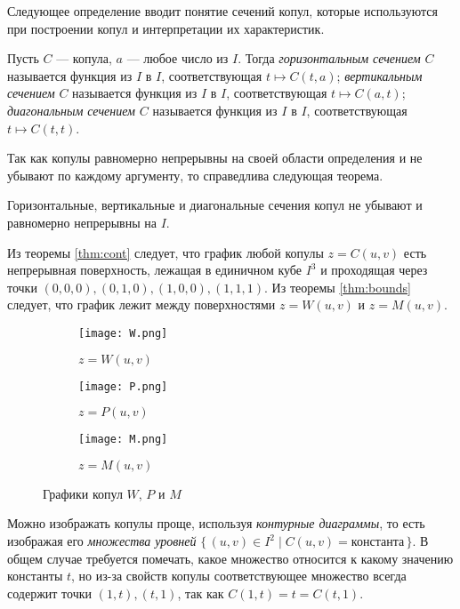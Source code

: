 Следующее определение вводит понятие сечений копул, которые используются при построении копул и интерпретации их характеристик.

\begin{define}
	Пусть $C$ --- копула, $a$ --- любое число из $I$. Тогда \emph{горизонтальным сечением} $C$ называется функция из $I$ в $I$, соответствующая $t \mapsto C(t, a)$; \emph{вертикальным сечением} $C$ называется функция из $I$ в $I$, соответствующая $t \mapsto C(a, t)$; \emph{диагональным сечением} $C$ называется функция из $I$ в $I$, соответствующая $t \mapsto C(t, t)$.
\end{define}

Так как копулы равномерно непрерывны на своей области определения и не убывают по каждому аргументу, то справедлива следующая теорема.

\begin{theorem}\label{thm:sections}
	Горизонтальные, вертикальные и диагональные сечения копул не убывают и равномерно непрерывны на $I$.
\end{theorem}

Из теоремы \ref{thm:cont} следует, что график любой копулы $z = C(u, v)$ есть непрерывная поверхность, лежащая в единичном кубе $I^3$ и проходящая через точки $(0, 0, 0), (0, 1, 0), (1, 0, 0), (1, 1, 1)$. Из теоремы \ref{thm:bounds} следует, что график лежит между поверхностями $z = W(u, v)$ и $z = M(u, v)$.

\begin{figure}[H]
	\centering
	\begin{subfigure}{.5\textwidth}
		\centering
		\texttt{[image: W.png]}
		\caption{$z = W(u, v)$}
	\end{subfigure}%
	\begin{subfigure}{.5\textwidth}
		\centering
		\texttt{[image: P.png]}
		\caption{$z = P(u, v)$}
	\end{subfigure}
	\begin{subfigure}{.5\textwidth}
		\centering
		\texttt{[image: M.png]}
		\caption{$z = M(u, v)$}
	\end{subfigure}
	\caption{Графики копул $W$, $P$ и $M$}
\end{figure}

Можно изображать копулы проще, используя \emph{контурные диаграммы}, то есть изображая его \emph{множества уровней} $\{\, (u, v) \in I^2 \mid C(u, v) = \text{константа} \,\}$. В общем случае требуется помечать, какое множество относится к какому значению константы $t$, но из-за свойств копулы соответствующее множество всегда содержит точки $(1, t), (t, 1)$, так как $C(1, t) = t = C(t, 1)$.

